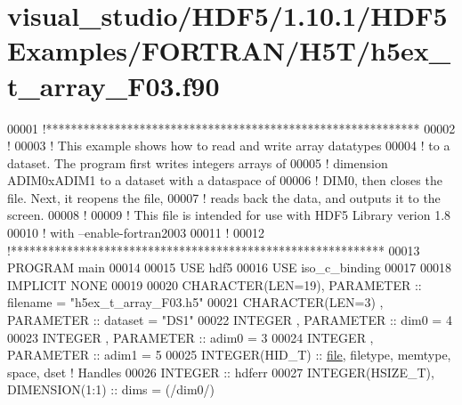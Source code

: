 \hypertarget{visual__studio_2_h_d_f5_21_810_81_2_h_d_f5_examples_2_f_o_r_t_r_a_n_2_h5_t_2h5ex__t__array___f03_8f90_source}{}\section{visual\+\_\+studio/\+H\+D\+F5/1.10.1/\+H\+D\+F5\+Examples/\+F\+O\+R\+T\+R\+A\+N/\+H5\+T/h5ex\+\_\+t\+\_\+array\+\_\+\+F03.f90}
\label{visual__studio_2_h_d_f5_21_810_81_2_h_d_f5_examples_2_f_o_r_t_r_a_n_2_h5_t_2h5ex__t__array___f03_8f90_source}

\begin{DoxyCode}
00001 \textcolor{comment}{!************************************************************}
00002 \textcolor{comment}{!}
00003 \textcolor{comment}{!  This example shows how to read and write array datatypes}
00004 \textcolor{comment}{!  to a dataset.  The program first writes integers arrays of}
00005 \textcolor{comment}{!  dimension ADIM0xADIM1 to a dataset with a dataspace of}
00006 \textcolor{comment}{!  DIM0, then closes the  file.  Next, it reopens the file,}
00007 \textcolor{comment}{!  reads back the data, and outputs it to the screen.}
00008 \textcolor{comment}{!}
00009 \textcolor{comment}{!  This file is intended for use with HDF5 Library verion 1.8}
00010 \textcolor{comment}{!  with --enable-fortran2003 }
00011 \textcolor{comment}{!}
00012 \textcolor{comment}{!************************************************************}
00013 \textcolor{keyword}{PROGRAM} main
00014 
00015   \textcolor{keywordtype}{USE }hdf5
00016   \textcolor{keywordtype}{USE }iso\_c\_binding
00017   
00018   \textcolor{keywordtype}{IMPLICIT NONE}
00019 
00020   \textcolor{keywordtype}{CHARACTER(LEN=19)}, \textcolor{keywordtype}{PARAMETER} :: filename  = \textcolor{stringliteral}{"h5ex\_t\_array\_F03.h5"}
00021   \textcolor{keywordtype}{CHARACTER(LEN=3)} , \textcolor{keywordtype}{PARAMETER} :: dataset   = \textcolor{stringliteral}{"DS1"}
00022   \textcolor{keywordtype}{INTEGER}          , \textcolor{keywordtype}{PARAMETER} :: dim0      = 4
00023   \textcolor{keywordtype}{INTEGER}          , \textcolor{keywordtype}{PARAMETER} :: adim0     = 3
00024   \textcolor{keywordtype}{INTEGER}          , \textcolor{keywordtype}{PARAMETER} :: adim1     = 5
00025   \textcolor{keywordtype}{INTEGER(HID\_T)}  :: \hyperlink{structfile}{file}, filetype, memtype, space, dset \textcolor{comment}{! Handles}
00026   \textcolor{keywordtype}{INTEGER} :: hdferr
00027   \textcolor{keywordtype}{INTEGER(HSIZE\_T)}, \textcolor{keywordtype}{DIMENSION(1:1)}   :: dims = (/dim0/)

\end{DoxyCode}
